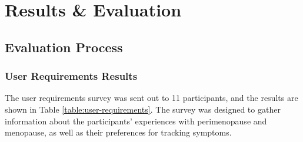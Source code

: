 \section{Results \& Evaluation}\label{results}


\subsection{Evaluation Process}

\subsubsection{User Requirements Results}

The user requirements survey was sent out to 11 participants, and the results are shown in Table \ref{table:user-requirements}. The survey was designed to gather information about the participants' experiences with perimenopause and menopause, as well as their preferences for tracking symptoms.


